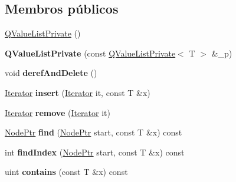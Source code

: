 \subsection*{Membros públicos}
\begin{DoxyCompactItemize}
\item 
\hyperlink{class_q_value_list_private_ae0015721a9736bbd1d14e67177687e69}{Q\-Value\-List\-Private} ()
\item 
\hypertarget{class_q_value_list_private_aec7821663ca93b1ca9bb3ffed7783e10}{{\bfseries Q\-Value\-List\-Private} (const \hyperlink{class_q_value_list_private}{Q\-Value\-List\-Private}$<$ T $>$ \&\-\_\-p)}\label{class_q_value_list_private_aec7821663ca93b1ca9bb3ffed7783e10}

\item 
\hypertarget{class_q_value_list_private_ad33c075eb3e4d97838430df8ad14b447}{void {\bfseries deref\-And\-Delete} ()}\label{class_q_value_list_private_ad33c075eb3e4d97838430df8ad14b447}

\item 
\hypertarget{class_q_value_list_private_aec8a3139cf85b97b8a56894ec03af1ef}{\hyperlink{class_q_value_list_private_a1f559ae0c1d2e8f55846ea5d1ea60977}{Iterator} {\bfseries insert} (\hyperlink{class_q_value_list_private_a1f559ae0c1d2e8f55846ea5d1ea60977}{Iterator} it, const T \&x)}\label{class_q_value_list_private_aec8a3139cf85b97b8a56894ec03af1ef}

\item 
\hypertarget{class_q_value_list_private_a38e033ea41e7e90a70cd61d6ec373d74}{\hyperlink{class_q_value_list_private_a1f559ae0c1d2e8f55846ea5d1ea60977}{Iterator} {\bfseries remove} (\hyperlink{class_q_value_list_private_a1f559ae0c1d2e8f55846ea5d1ea60977}{Iterator} it)}\label{class_q_value_list_private_a38e033ea41e7e90a70cd61d6ec373d74}

\item 
\hypertarget{class_q_value_list_private_a617b994c8173549a75145eaa85fbf4ae}{\hyperlink{class_q_value_list_node}{Node\-Ptr} {\bfseries find} (\hyperlink{class_q_value_list_node}{Node\-Ptr} start, const T \&x) const }\label{class_q_value_list_private_a617b994c8173549a75145eaa85fbf4ae}

\item 
\hypertarget{class_q_value_list_private_ae2295590c7a85567bf76514f6e237e7f}{int {\bfseries find\-Index} (\hyperlink{class_q_value_list_node}{Node\-Ptr} start, const T \&x) const }\label{class_q_value_list_private_ae2295590c7a85567bf76514f6e237e7f}

\item 
\hypertarget{class_q_value_list_private_a92417aaadba244eb74efa684a4bfa07b}{uint {\bfseries contains} (const T \&x) const }\label{class_q_value_list_private_a92417aaadba244eb74efa684a4bfa07b}


\end{DoxyCompactItemize}

